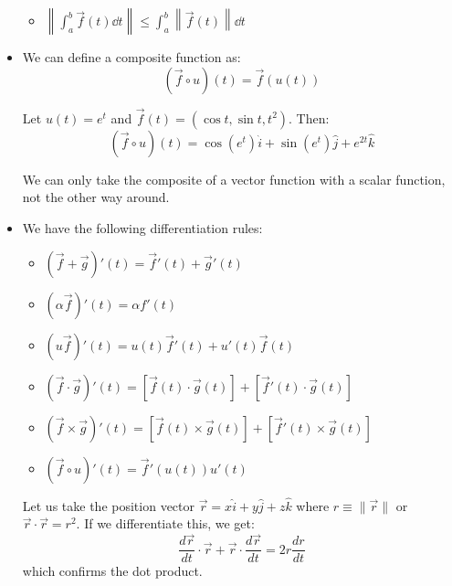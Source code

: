 \begin{itemize}
\begin{itemize}
        \item $\left\lVert \int_a^b \vec{f}(t) \dd{t} \right\rVert \le \int_a^b \left\lVert \vec{f}(t) \right\rVert \dd{t}$
    \end{itemize}
    \item We can define a composite function as:
    \begin{equation}
        (\vec{f} \circ u)(t) =\vec{f}(u(t))
    \end{equation}
    \begin{example}
        Let $u(t)=e^t$ and $\vec{f}(t) = (\cos t, \sin t, t^2)$. Then:
        \begin{equation}
            (\vec{f} \circ u)(t) = \cos(e^t)\hat{i} + \sin(e^t)\hat{j} + e^{2t}\hat{k}
        \end{equation}
    \end{example}
    \begin{warning}
        We can only take the composite of a vector function with a scalar function, not the other way around.
    \end{warning}
    \item We have the following differentiation rules:
    \begin{itemize}
        \item $(\vec{f}+\vec{g})'(t) = \vec{f}'(t) + \vec{g}'(t)$
        \item $(\alpha\vec{f})'(t) = \alpha f'(t)$
        \item $(u\vec{f})'(t) = u(t)\vec{f}'(t) + u'(t)\vec{f}(t)$
        \item $(\vec{f}\cdot \vec{g})'(t) = \left[\vec{f}(t) \cdot \vec{g}(t)\right] + \left[\vec{f}'(t) \cdot \vec{g}(t)\right]$
        \item $(\vec{f} \times \vec{g})'(t) = \left[\vec{f}(t) \times \vec{g}(t)\right] + \left[\vec{f}'(t) \times \vec{g}(t)\right]$
        \item $(\vec{f}\circ u)'(t) = \vec{f}'(u(t))u'(t)$
    \end{itemize}
    \begin{example}
        Let us take the position vector $\vec{r} = x\hat{i} + y\hat{j}+z\hat{k}$ where $r\equiv \lVert \vec{r} \rVert$ or $\vec{r}\cdot \vec{r} = r^2$. If we differentiate this, we get:
        \begin{equation}
            \frac{d\vec{r}}{dt} \cdot \vec{r} + \vec{r} \cdot \frac{d\vec{r}}{dt} = 2r\frac{dr}{dt}
        \end{equation}
        which confirms the dot product.
    \end{example}

\end{itemize}
